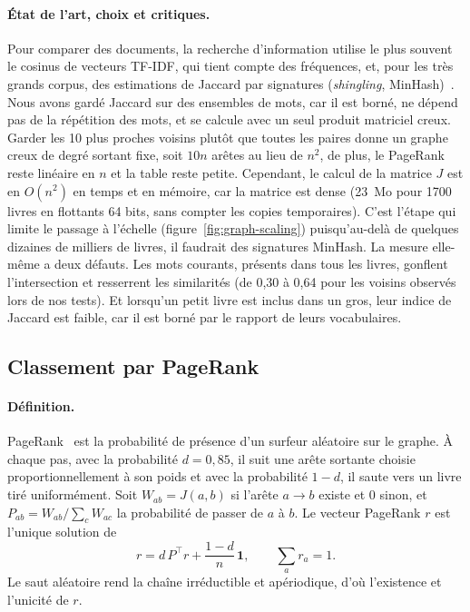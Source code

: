 \documentclass[11pt,a4paper]{article}
\begin{document}
\paragraph{État de l'art, choix et critiques.}
Pour comparer des documents, la recherche d'information utilise le plus souvent le cosinus de vecteurs TF-IDF, qui tient compte des fréquences, et, pour les très grands corpus, des estimations de Jaccard par signatures (\emph{shingling}, MinHash)~\cite{iir}. Nous avons gardé Jaccard sur des ensembles de mots, car il est borné, ne dépend pas de la répétition des mots, et se calcule avec un seul produit matriciel creux. Garder les 10 plus proches voisins plutôt que toutes les paires donne un graphe creux de degré sortant fixe, soit $10n$ arêtes au lieu de $n^2$, de plus, le PageRank reste linéaire en $n$ et la table reste petite. Cependant, le calcul de la matrice $J$ est en $O(n^2)$ en temps et en mémoire, car la matrice est dense (23~Mo pour 1700 livres en flottants 64 bits, sans compter les copies temporaires). C'est l'étape qui limite le passage à l'échelle (figure~\ref{fig:graph-scaling}) puisqu'au-delà de quelques dizaines de milliers de livres, il faudrait des signatures MinHash. La mesure elle-même a deux défauts. Les mots courants, présents dans tous les livres, gonflent l'intersection et resserrent les similarités (de 0,30 à 0,64 pour les voisins observés lors de nos tests). Et lorsqu'un petit livre est inclus dans un gros, leur indice de Jaccard est faible, car il est borné par le rapport de leurs vocabulaires.

\subsection{Classement par PageRank}
\label{sec:pagerank}

\paragraph{Définition.}
PageRank~\cite{pagerank} est la probabilité de présence d'un surfeur aléatoire sur le graphe. À chaque pas, avec la probabilité $d=0{,}85$, il suit une arête sortante choisie proportionnellement à son poids et avec la probabilité $1-d$, il saute vers un livre tiré uniformément. Soit $W_{ab} = J(a,b)$ si l'arête $a \to b$ existe et $0$ sinon, et $P_{ab} = W_{ab} / \sum_c W_{ac}$ la probabilité de passer de $a$ à $b$. Le vecteur PageRank $r$ est l'unique solution de
\[
    r = d\,P^{\top} r + \frac{1-d}{n}\,\mathbf{1}, \qquad \textstyle\sum_a r_a = 1 .
\]
Le saut aléatoire rend la chaîne irréductible et apériodique, d'où l'existence et l'unicité de $r$.
\end{document}
